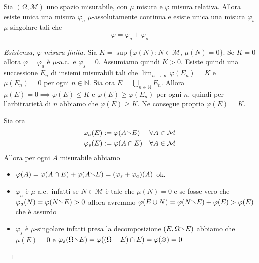 \begin{theorem}\label{thm:dec_leb}
    Sia \((\Omega, \mathcal{M})\) uno spazio misurabile, con \(\mu\) misura e
    \(\varphi \) misura relativa. Allora esiste unica una misura \(\varphi_a\)
    \(\mu\)-assolutamente continua e esiste unica una misura \(\varphi_s\)
    \(\mu\)-singolare tali che
    \[
        \varphi = \varphi_a + \varphi_s
    \]
\end{theorem}
\begin{proof}[Esistenza, \(\varphi \) misura finita]
    Sia \(K = \sup \{ \varphi (N) : N \in \mathcal{M}, \, \mu(N) = 0\} \). Se
    \(K = 0\) allora \(\varphi =\varphi_a\) è \(\mu\)-a.c.~e \(\varphi_s = 0\).
    Assumiamo quindi \(K > 0\). Esiste quindi una successione \(E_{n}\) di
    insiemi misurabili tali che \(\lim_{n \to \infty} \varphi (E_{n}) = K\) e
    \(\mu(E_{n}) = 0\) per ogni \(n \in \mathbb{N}\). Sia ora \(E = \bigcup_{n
    \in \mathbb{N}} E_{n}\). Allora \(\mu(E) = 0 \implies \varphi (E) \le K\) e
    \(\varphi (E) \ge \varphi (E_{n})\) per ogni \(n\), quindi per
    l'arbitrarietà di \(n\) abbiamo che \(\varphi(E) \ge K\). Ne consegue
    proprio \(\varphi (E) = K\).

    Sia ora
    \begin{align*}
        \varphi_a(E) &:= \varphi (A \sminus E) &\forall A \in \mathcal{M} \\
        \varphi_s(E) &:= \varphi (A \cap E) &\forall A \in \mathcal{M}
    \end{align*}
    Allora per ogni \(A\) misurabile abbiamo
\begin{itemize}[label = --]
    \item \(\varphi(A) = \varphi (A \cap E) + \varphi (A \sminus E) = (\varphi_s
        + \varphi_a)(A)\) ok.
    \item \(\varphi_a\) è \(\mu\)-a.c.~infatti se \(N \in \mathcal{M}\) è tale
        che \(\mu(N) = 0\) e se fosse
        vero che \(\varphi_a(N) = \varphi (N \sminus E) > 0\) allora avremmo
        \(\varphi (E \cup N) = \varphi (N \sminus E) + \varphi (E) > \varphi
        (E)\) che è assurdo
    \item \(\varphi_s\) è \(\mu\)-singolare infatti presa la decomposizione
        \((E, \Omega \sminus E)\) abbiamo che \\ \(\mu(E) = 0\) e
        \(\varphi_s(\Omega \sminus E) = \varphi ((\Omega - E) \cap E) =
        \varphi(\varnothing) = 0\) 
\end{itemize}
\end{proof}
